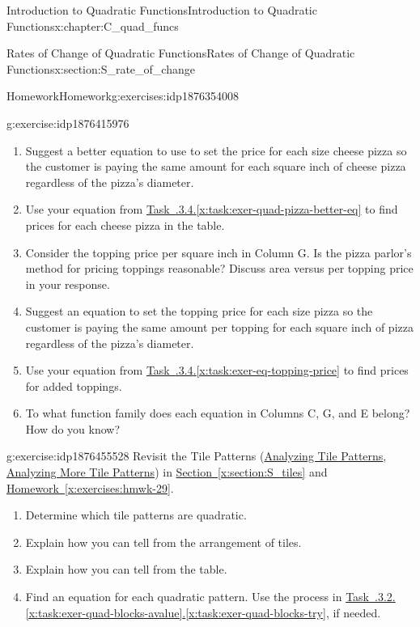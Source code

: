 \documentclass[oneside,10pt,]{book}
\newcommand{\xreffont}{\relax}
\numberwithin{equation}{chapter}
\begin{document}
\begin{chapterptx}{Introduction to Quadratic Functions}{}{Introduction to Quadratic Functions}{}{}{x:chapter:C_quad_funcs}
\begin{sectionptx}{Rates of Change of Quadratic Functions}{}{Rates of Change of Quadratic Functions}{}{}{x:section:S_rate_of_change}
\begin{exercises-subsection}{Homework}{}{Homework}{}{}{g:exercises:idp1876354008}
\begin{divisionexercise}{4}{}{}{g:exercise:idp1876415976}
\begin{enumerate}[font=\bfseries,label=(\alph*),ref=\alph*]
\item\label{x:task:exer-quad-pizza-better-eq}Suggest a better equation to use to set the price for each size cheese pizza so the customer is paying the same amount for each square inch of cheese pizza regardless of the pizza's diameter.%
\item{}Use your equation from \hyperref[x:task:exer-quad-pizza-better-eq]{Task~{\xreffont 4.4.3.4}.{\xreffont\ref{x:task:exer-quad-pizza-better-eq}}} to find prices for each cheese pizza in the table.%
\item{}Consider the topping price per square inch in Column G. Is the pizza parlor's method for pricing toppings reasonable? Discuss area versus per topping price in your response.%
\item\label{x:task:exer-eq-topping-price}Suggest an equation to set the topping price for each size pizza so the customer is paying the same amount per topping for each square inch of pizza regardless of the pizza's diameter.%
\item{}Use your equation from \hyperref[x:task:exer-eq-topping-price]{Task~{\xreffont 4.4.3.4}.{\xreffont\ref{x:task:exer-eq-topping-price}}} to find prices for added toppings.%
\item{}To what function family does each equation in Columns C, G, and E belong? How do you know?%
\end{enumerate}
\end{divisionexercise}%
\begin{divisionexercise}{5}{}{}{g:exercise:idp1876455528}%
Revisit the Tile Patterns (\hyperref[x:worksheet:act-analyze-tiles]{Analyzing Tile Patterns}, \hyperref[x:worksheet:act-analyze-more-tiles]{Analyzing More Tile Patterns}) in \hyperref[x:section:S_tiles]{Section~{\xreffont\ref{x:section:S_tiles}}} and \hyperref[x:exercises:hmwk-29]{Homework~{\xreffont\ref{x:exercises:hmwk-29}}}.%
\begin{enumerate}[font=\bfseries,label=(\alph*),ref=\alph*]
\item{}Determine which tile patterns are quadratic.%
\item{}Explain how you can tell from the arrangement of tiles.%
\item{}Explain how you can tell from the table.%
\item{}Find an equation for each quadratic pattern. Use the process in \hyperref[x:task:exer-quad-blocks-avalue]{Task~{\xreffont 4.4.3.2}.{\xreffont\ref{x:task:exer-quad-blocks-avalue}}\textendash{}{\xreffont 4.4.3.2}.{\xreffont\ref{x:task:exer-quad-blocks-try}}}, if needed.%

\end{enumerate}
\end{divisionexercise}
\end{exercises-subsection}
\end{sectionptx}
\end{chapterptx}
\end{document}
